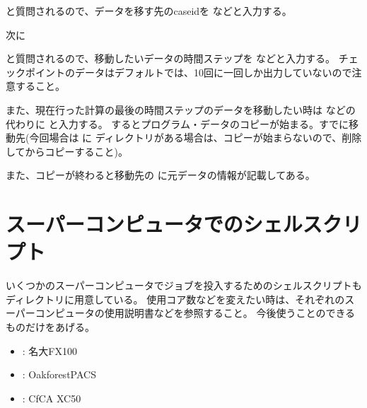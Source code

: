 \documentclass[letterpaper,10pt,dvipdfmx,report]{sphinxmanual}
\begin{document}
\begin{sphinxVerbatim}[commandchars=\\\{\}]
      
\end{sphinxVerbatim}

と質問されるので、データを移す先のcaseidを  などと入力する。

次に

\begin{sphinxVerbatim}[commandchars=\\\{\}]
         
\end{sphinxVerbatim}

と質問されるので、移動したいデータの時間ステップを  などと入力する。
チェックポイントのデータはデフォルトでは、10回に一回しか出力していないので注意すること。

また、現在行った計算の最後の時間ステップのデータを移動したい時は  などの代わりに
 と入力する。
するとプログラム・データのコピーが始まる。すでに移動先(今回場合は  に  ディレクトリがある場合は、コピーが始まらないので、削除してからコピーすること)。

また、コピーが終わると移動先の  に元データの情報が記載してある。


\section{スーパーコンピュータでのシェルスクリプト}
\label{\detokenize{start:id12}}
いくつかのスーパーコンピュータでジョブを投入するためのシェルスクリプトも  ディレクトリに用意している。
使用コア数などを変えたい時は、それぞれのスーパーコンピュータの使用説明書などを参照すること。
今後使うことのできるものだけをあげる。
\begin{itemize}
\item {} 
 : 名大FX100

\item {} 
 : Oakforest\sphinxhyphen{}PACS

\item {} 
 : CfCA XC50

\end{itemize}
\end{document}
